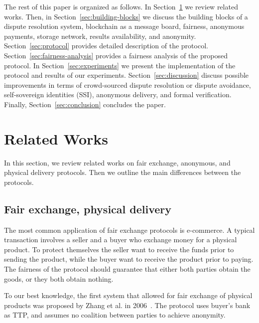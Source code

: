 \documentclass[pdftex,twocolumn,epjc3]{svjour3}
\begin{document}
The rest of this paper is organized as follows.
In Section~\ref{sec:related-works} we review related works. 
Then, in Section~\ref{sec:building-blocks} we discuss the building blocks of a dispute resolution system, blockchain as a message board, fairness, anonymous payments, storage network, results availability, and anonymity.
Section~\ref{sec:protocol} provides detailed description of the protocol.
Section~\ref{sec:fairness-analysis} provides a fairness analysis of the proposed protocol.
In Section~\ref{sec:experiments} we present the implementation of the protocol and results of our experiments.
Section~\ref{sec:discussion} discuss possible improvements in terms of crowd-sourced dispute resolution or dispute avoidance, self-sovereign identities (SSI), anonymous delivery, and formal verification.
Finally, Section~\ref{sec:conclusion} concludes the paper.


\section{Related Works}\label{sec:related-works}
In this section, we review related works on fair exchange, anonymous, and physical delivery protocols. Then we outline the main differences between the protocols.

\subsection{Fair exchange, physical delivery}
The most common application of fair exchange protocols is e-commerce. A typical transaction involves a seller and a buyer who exchange money for a physical product. To protect themselves the seller want to receive the funds prior to sending the product, while the buyer want to receive the product prior to paying. The fairness of the protocol should guarantee that either both parties obtain the goods, or they both obtain nothing.

To our best knowledge, the first system that allowed for fair exchange of physical products was proposed by Zhang et al. in 2006~\cite{zhangPracticalFairExchangeEPayment2006}. The protocol uses buyer's bank as TTP, and assumes no coalition between parties to achieve anonymity. 
\end{document}
